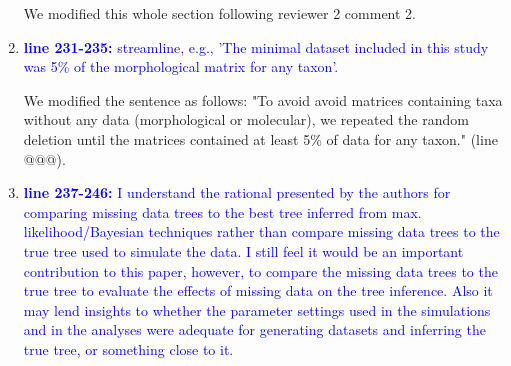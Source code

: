 \documentclass[12pt,letterpaper]{article}
\begin{document}
\begin{enumerate}
We modified this whole section following reviewer 2 comment 2.

\item{\textcolor{blue}{\textbf{line 231-235:} streamline, e.g., 'The minimal dataset included in this study was 5\% of the morphological matrix for any taxon'.}}

We modified the sentence as follows: "To avoid avoid matrices containing taxa without any data (morphological or molecular), we repeated the random deletion until the matrices contained at least 5\% of data for any taxon." (line @@@).

\item{\textcolor{blue}{\textbf{line 237-246:} I understand the rational presented by the authors for comparing missing data trees to the best tree inferred from max. likelihood/Bayesian techniques rather than compare missing data trees to the true tree used to simulate the data. I still feel it would be an important contribution to this paper, however, to compare the missing data trees to the true tree to evaluate the effects of missing data on the tree inference. Also it may lend insights to whether the parameter settings used in the simulations and in the analyses were adequate for generating datasets and inferring the true tree, or something close to it. }}


\end{enumerate}
\end{document}
